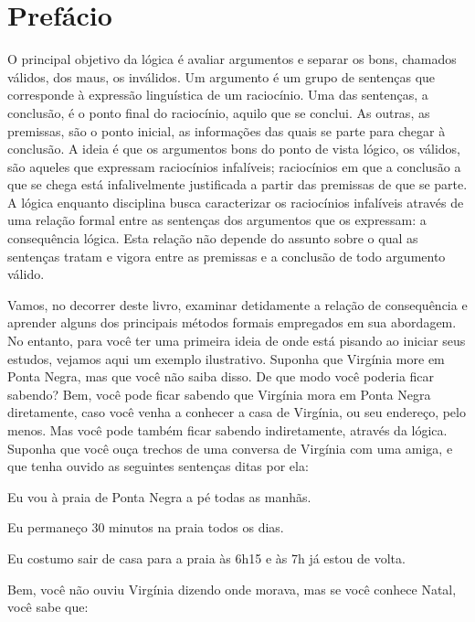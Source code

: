 \chapter{Prefácio}

O principal objetivo da lógica é avaliar argumentos e separar os bons, chamados válidos, dos maus, os inválidos.
Um argumento é um grupo de sentenças que corresponde à expressão linguística de um raciocínio.
Uma das sentenças, a conclusão, é o ponto final do raciocínio, aquilo que se conclui.
As outras, as premissas, são o ponto inicial, as informações das quais se parte para chegar à conclusão.
A ideia é que os argumentos bons do ponto de vista lógico, os válidos, são aqueles que expressam raciocínios infalíveis; raciocínios em que a conclusão a que se chega está infalivelmente justificada a partir das premissas de que se parte.
A lógica enquanto disciplina busca caracterizar os raciocínios infalíveis através de uma relação formal entre as sentenças dos argumentos que os expressam: a consequência lógica.
Esta relação não depende do assunto sobre o qual as sentenças tratam e vigora entre as premissas e a conclusão de todo argumento válido.

Vamos, no decorrer deste livro, examinar detidamente a relação de consequência e aprender alguns dos principais métodos formais empregados em sua abordagem.
No entanto, para você ter uma primeira ideia de onde está pisando ao iniciar seus estudos, vejamos aqui um exemplo ilustrativo.
Suponha que Virgínia more em Ponta Negra, mas que você não saiba disso.
De que modo você poderia ficar sabendo?
Bem, você pode ficar sabendo que Virgínia mora em Ponta Negra diretamente, caso você venha a conhecer a casa de Virgínia, ou seu endereço, pelo menos.
Mas você pode também ficar sabendo indiretamente, através da lógica.
Suponha que você ouça trechos de uma conversa de Virgínia com uma amiga, e que tenha ouvido as seguintes sentenças ditas por ela:
\begin{earg}
	\item Eu vou à praia de Ponta Negra a pé todas as manhãs.
	\item Eu permaneço 30 minutos na praia todos os dias.
	\item Eu costumo sair de casa para a praia às 6h15 e às 7h já estou de volta.
\end{earg}
Bem, você não ouviu Virgínia dizendo onde morava, mas se você conhece Natal, você sabe que:

